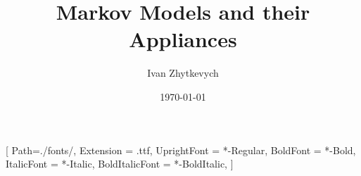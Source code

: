 [
    Path=./fonts/,
    Extension = .ttf,
    UprightFont = *-Regular,
    BoldFont = *-Bold,
    ItalicFont = *-Italic,
    BoldItalicFont = *-BoldItalic,
]

\title{Markov Models and their Appliances}
\author{Ivan Zhytkevych}
\date{\today}

\newtheorem{theorem}{Theorem}[section]
\newtheorem{claim}[theorem]{Claim}              %
\newtheorem{proposition}[theorem]{Proposition}  %
\newtheorem{lemma}[theorem]{Lemma}              %
\newtheorem{corollary}[theorem]{Corollary}      %
\newtheorem{conjecture}[theorem]{Conjecture}    %
\newtheorem*{observation}{Observation}
\newtheorem*{remark}{Remark}
\newtheorem{definition}{Definition}


\newenvironment{example}[1][]
{
\par
\noindent
\textit{\textbf{Example}} \textit{\ifx\newenvironment#1\newenvironment\else\space\fi#1:}
\\
}
{
  \null\hfill $\blacksquare$
  \\
}


\newcommand{\incfig}[2][1]{%
    \def\svgwidth{.8\columnwidth}
    {#2.pdf_tex}
}

%
